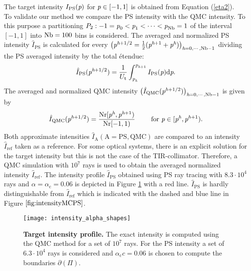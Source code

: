The target intensity $I_{\textrm{PS}}(\textit{p})$ for $\textit{p}\in[-1,1]$ is obtained from Equation (\ref{eta2}). \\ \indent
To validate our method we compare the PS intensity with the QMC intensity. 
To this purpose a partitioning $P_2:-1=\textit{p}_{0}<\textit{p}_1<\cdots<\textit{p}_{\textrm{Nb}}=1$ of the interval $[-1,1]$ into $\textrm{Nb}=100$ bins is considered. 
The averaged and normalized PS intensity $\hat{I}_{\textrm{PS}}$ is calculated for every 
$\big(\textit{p}^{\textit{h}+1/2} = \frac{1}{2}(\textit{p}^{\textit{h}+1}+ \textit{p}^{\textit{h}})\big)_{\textit{h}=0, \cdots, \textrm{Nb}-1}$ dividing the PS averaged intensity by the total \'{e}tendue:
\begin{equation}\label{eq:normalized_PS_intensity}
\hat{I}_{\textrm{PS}}(\textit{p}^{\textit{h}+1/2}) = \frac{1}{U_{\textrm{t}}}\int_{\textit{p}_{\textit{h}}}^{\textit{p}_{\textit{h}+1}} I_{\textrm{PS}}(\textit{p})\textrm{d}\textit{p}.
\end{equation}
The averaged and normalized QMC intensity $\big(\hat{I}_{\textrm{QMC}}(\textit{p}^{\textit{h}+1/2})\big)_{\textit{h} = 0, \cdots, \textrm{Nb}-1}$ is given by
\begin{equation}\label{eq:normalized_MC_intensity}
\hat{I}_{\textrm{QMC}}(\textit{p}^{\textit{h}+1/2}) = \frac{\textrm{Nr}[\textit{p}^{\textit{h}},\textit{p}^{\textit{h}+1})}{\textrm{Nr}[-1,1)} 
\qquad \mbox{ for } \textit{p}\in[\textit{p}^{\textit{h}}, \textit{p}^{\textit{h}+1}).
\end{equation} 
Both approximate intensities $\hat{I}_{\textrm{A}} (\textrm{A} = \textrm{PS}, \textrm{QMC})$ are compared to an intensity $\hat{I}_{\textrm{ref}}$ taken as a reference. For some optical systems, there is an explicit solution for the target intensity but this is not the case of the TIR-collimator.
Therefore, a QMC simulation with $10^7$ rays is used to obtain the averaged normalized intensity $\hat{I}_{\textrm{ref}}$.
The intensity profile $\hat{I}_{\textrm{PS}}
$ obtained using PS ray tracing with $8.3\cdot 10^4$ rays and $\alpha= \alpha_\textrm{c} = 0.06$ is depicted in Figure \ref{fig:intensityMCPS} with a red line.
$\hat{I}_{\textrm{PS}}$ is hardly distinguishable from $\hat{I}_{\textrm{ref}}$ which is indicated with the dashed and blue line in Figure $\ref{fig:intensityMCPS}$.\\ \indent
  \begin{figure}[h]
    \centering
    \texttt{[image: intensity\_alpha\_shapes]}
\caption{\textbf{Target intensity profile.}
The exact intensity is computed using the QMC method for a set of $10^7$ rays. For the PS intensity a set of $6.3\cdot 10^4$
rays is considered and $\alpha_\textrm{c}c = 0.06$ is chosen to compute the boundaries $\partial$$(\Pi)$.}
  \label{fig:intensityMCPS}
\end{figure}
